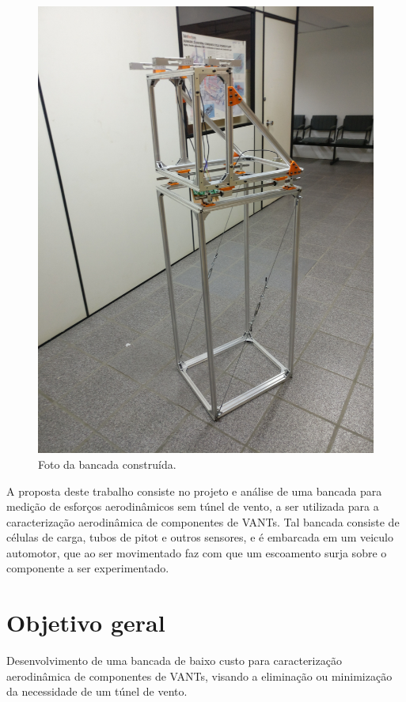 \begin{figure}[!ht]
    \centering
    \includegraphics[width=.8\linewidth]{figuras/construcao/bancada_inteira.jpg}
    \caption{Foto da bancada construída\cite{autor}.}
    \label{fig:bancada_construida}
\end{figure}

A proposta deste trabalho consiste no projeto e análise de uma bancada para medição de esforços aerodinâmicos sem túnel de vento, a ser utilizada para a caracterização aerodinâmica de componentes de VANTs. Tal bancada consiste de células de carga, tubos de pitot e outros sensores, e é embarcada em um veiculo automotor, que ao ser movimentado faz com que um escoamento surja sobre o componente a ser experimentado.

\section{Objetivo geral}

Desenvolvimento de uma bancada de baixo custo para caracterização aerodinâmica de componentes de VANTs, visando a eliminação ou minimização da necessidade de um túnel de vento.
